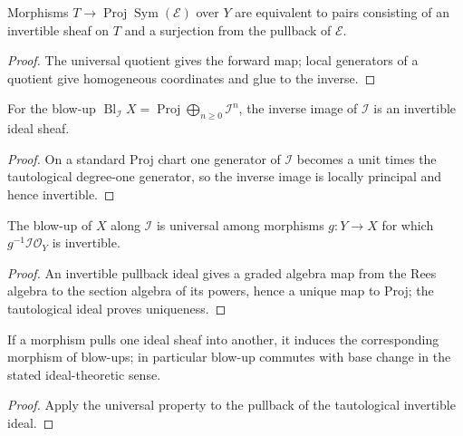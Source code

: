 \begin{proposition}
\label{prop:II-7-12}
Morphisms $T\to\operatorname{Proj}\operatorname{Sym}(\mathcal E)$ over $Y$ are equivalent to pairs
consisting of an invertible sheaf on $T$ and a surjection from the pullback of $\mathcal E$.
\end{proposition}
\begin{proof}
The universal quotient gives the forward map; local generators of a quotient give homogeneous
coordinates and glue to the inverse.
\end{proof}

\begin{proposition}
\label{prop:II-7-13}
For the blow-up $\operatorname{Bl}_\mathcal I X=\operatorname{Proj}\bigoplus_{n\geq0}\mathcal I^n$,
the inverse image of $\mathcal I$ is an invertible ideal sheaf.
\end{proposition}
\begin{proof}
On a standard Proj chart one generator of $\mathcal I$ becomes a unit times the tautological degree-one
generator, so the inverse image is locally principal and hence invertible.
\end{proof}

\begin{proposition}
\label{prop:II-7-14}
The blow-up of $X$ along $\mathcal I$ is universal among morphisms $g:Y\to X$ for which
$g^{-1}\mathcal I\mathcal O_Y$ is invertible.
\end{proposition}
\begin{proof}
An invertible pullback ideal gives a graded algebra map from the Rees algebra to the section algebra
of its powers, hence a unique map to Proj; the tautological ideal proves uniqueness.
\end{proof}

\begin{corollary}
\label{cor:II-7-15}
If a morphism pulls one ideal sheaf into another, it induces the corresponding morphism of blow-ups;
in particular blow-up commutes with base change in the stated ideal-theoretic sense.
\end{corollary}
\begin{proof}
Apply the universal property to the pullback of the tautological invertible ideal.
\end{proof}


